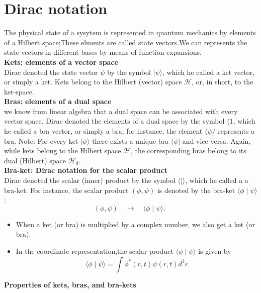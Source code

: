 \section{Dirac notation}
The physical state of a sysytem is represented in quantum mechanics by elements of a Hilbert space;These elments are called state vectors.We can represents the state vectors in different bases by means of function expansions.\\
\textbf{Kets: elements of a vector space}\\
Dirac denoted the state vector $\psi $ by the symbol $|\psi\rangle$, which he called a ket vector, or simply a ket. Kets belong to the Hilbert (vector) space $\mathcal{H}$, or, in short, to the ket-space.\\
\textbf{Bras: elements of a dual space}\\
 we know from linear algebra that a dual space can be associated with every vector space. Dirac denoted the elements of a dual space by the symbol $\langle 1$, which he called a bra vector, or simply a bra; for instance, the element $\langle\psi /$ represents a bra. Note: For every ket $|\psi\rangle$ there exists a unique bra $\langle\psi|$ and vice versa. Again, while kets belong to the Hilbert space $\mathcal{H}$, the corresponding bras belong to its dual (Hilbert) space $\mathcal{H}_{d}$.\\
 \textbf{Bra-ket: Dirac notation for the scalar product}\\
 Dirac denoted the scalar (inner) product by the symbol $\langle\mid\rangle$, which he called a a bra-ket. For instance, the scalar product $(\phi, \psi)$ is denoted by the bra-ket $\langle\phi \mid \psi\rangle$ :
 $$
 (\phi, \psi) \quad \longrightarrow \quad\langle\phi \mid \psi\rangle \text {. }
 $$
 \begin{note}
 	\begin{itemize}
 		\item When a ket (or bra) is multiplied by a complex number, we also get a ket (or bra).
 		\item In the coordinate representation,the scalar product $\langle\phi \mid \psi\rangle$ is given by\\
 		$$\langle\phi \mid \psi\rangle=\int \phi^*(r,t)\psi(r,t)d^3r$$
 	\end{itemize}
 \end{note}
\newpage
\textbf{ Properties of kets, bras, and bra-kets}  \\
